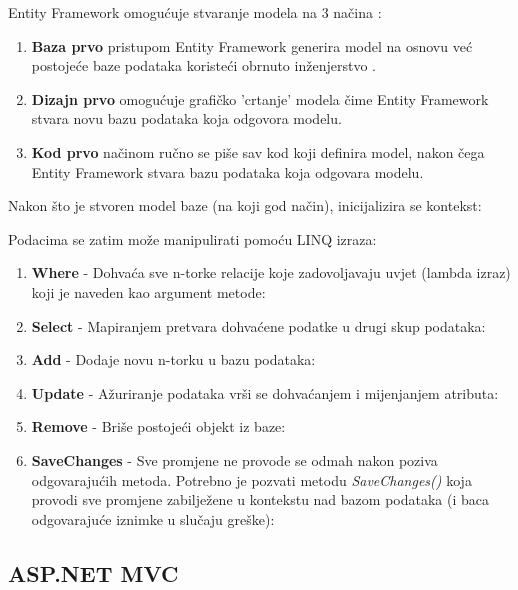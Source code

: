 \documentclass[times, utf8, zavrsni]{fer}
\begin{document}
Entity Framework omogućuje stvaranje modela na 3 načina \citep{entity}:
\begin{enumerate}
\item \textbf{Baza prvo}  pristupom Entity Framework generira model na osnovu već postojeće baze podataka koristeći obrnuto inženjerstvo .
\item \textbf{Dizajn prvo}  omogućuje grafičko 'crtanje' modela čime Entity Framework stvara novu bazu podataka koja odgovora modelu.
\item \textbf{Kod prvo}  načinom ručno se piše sav kod koji definira model, nakon čega Entity Framework stvara bazu podataka koja odgovara modelu.
\end{enumerate}

Nakon što je stvoren model baze (na koji god način), inicijalizira se kontekst:

\lstset{style=csharp, numbers=none}


Podacima se zatim može manipulirati pomoću LINQ izraza:

\begin{enumerate}
\item \textbf{Where} - Dohvaća sve n-torke relacije koje zadovoljavaju uvjet (lambda izraz) koji je naveden kao argument metode:


\item \textbf{Select} - Mapiranjem pretvara dohvaćene podatke u drugi skup podataka:

\item \textbf{Add} - Dodaje novu n-torku u bazu podataka:

\item \textbf{Update} - Ažuriranje podataka vrši se dohvaćanjem i mijenjanjem atributa:

\item \textbf{Remove} - Briše postojeći objekt iz baze:

\item \textbf{SaveChanges} - Sve promjene ne provode se odmah nakon poziva odgovarajućih metoda. Potrebno je pozvati metodu \emph{SaveChanges()} koja provodi sve promjene zabilježene u kontekstu nad bazom podataka (i baca odgovarajuće iznimke u slučaju greške):


\end{enumerate}

\subsection{ASP.NET MVC}
\end{document}

